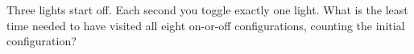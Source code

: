 Three lights start off. Each second you toggle exactly one light. What is the least time needed to have visited all eight on-or-off configurations, counting the initial configuration?

